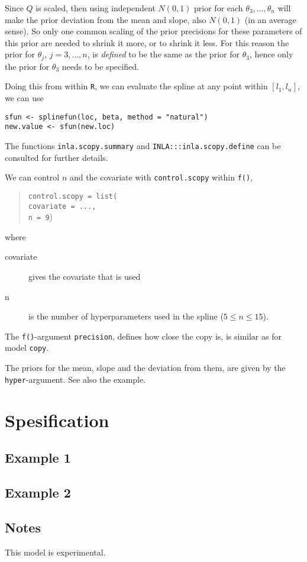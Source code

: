 \documentclass[a4paper,11pt]{article}
\begin{document}
Since $Q$ is scaled, then using independent $N(0,1)$ prior for each
$\theta_{3}, \ldots, \theta_n$ will make the prior deviation from the
mean and slope, also $N(0,1)$ (in an average sense). So only one
common scaling of the prior precisions for these parameters of this
prior are needed to shrink it more, or to shrink it less. For this
reason the prior for $\theta_{j}$, $j=3, \ldots, n$, is \emph{defined}
to be the same as the prior for $\theta_3$, hence only the prior for
$\theta_3$ needs to be specified.

Doing this from within \texttt{R}, we can evaluate the spline at any
point within $[l_1, l_n]$, we can use
\begin{verbatim}
sfun <- splinefun(loc, beta, method = "natural")
new.value <- sfun(new.loc)
\end{verbatim}
The functions \texttt{inla.scopy.summary} and
\texttt{INLA:::inla.scopy.define} can be consulted for further
details.


We can control $n$ and the covariate with
\texttt{control.scopy} within \texttt{f()},
\begin{quote}
    \texttt{control.scopy = list(\\
        covariate = ..., \\
        n = 9})
\end{quote}
where
\begin{description}
\item[covariate] gives the covariate that is used
\item[n] is the number of hyperparameters used in the spline
    ($5 \leq n \leq 15$).
\end{description}
The \texttt{f()}-argument \texttt{precision}, defines how close the
copy is, is similar as for model \texttt{copy}.

The priors for the mean, slope and the deviation from them, are given
by the \texttt{hyper}-argument. See also the example.

\clearpage
\section*{Spesification}


\clearpage
\subsection*{Example 1}
{\small}
\subsection*{Example 2}
{\small}

\subsection*{Notes}

This model is experimental.
\end{document}
